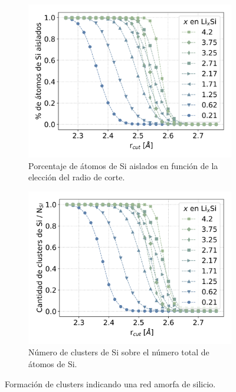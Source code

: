 \begin{figure}[h]
    \centering
    \begin{subfigure}{.475\textwidth}
        \centering
        \includegraphics[width=\textwidth]{caracterizacion/resultados/clusters/cluster-isolated.png}
        \caption{Porcentaje de átomos de Si aislados en función de la elección del
        radio de corte.}
        \label{fig:clusters-isolated}
    \end{subfigure}
    \hfill
    \begin{subfigure}{.475\textwidth}
        \centering
        \includegraphics[width=\textwidth]{caracterizacion/resultados/clusters/cluster-nclusters.png}
        \caption{Número de clusters de Si sobre el número total de átomos de Si.}
        \label{fig:clusters-nclusters}
    \end{subfigure}
    \caption{Formación de clusters indicando una red amorfa de silicio.}
    \label{fig:clusters}
\end{figure}
